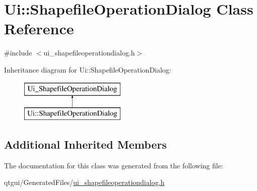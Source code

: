 \hypertarget{class_ui_1_1_shapefile_operation_dialog}{}\section{Ui\+::Shapefile\+Operation\+Dialog Class Reference}
\label{class_ui_1_1_shapefile_operation_dialog}


{\ttfamily \#include $<$ui\+\_\+shapefileoperationdialog.\+h$>$}

Inheritance diagram for Ui\+::Shapefile\+Operation\+Dialog\+:\begin{figure}[H]
\begin{center}
\leavevmode
\includegraphics[height=2.000000cm]{d8/dc8/class_ui_1_1_shapefile_operation_dialog}
\end{center}
\end{figure}
\subsection*{Additional Inherited Members}


The documentation for this class was generated from the following file\+:\begin{DoxyCompactItemize}
\item 
qtgui/\+Generated\+Files/\mbox{\hyperlink{ui__shapefileoperationdialog_8h}{ui\+\_\+shapefileoperationdialog.\+h}}\end{DoxyCompactItemize}
